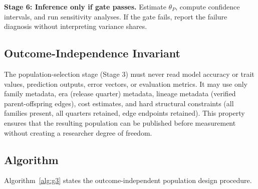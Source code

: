 \documentclass[11pt]{article}
\theoremstyle{definition}
\theoremstyle{plain}
\begin{document}
\textbf{Stage 6: Inference only if gate passes.} Estimate $\theta_P$, compute confidence intervals, and run sensitivity analyses. If the gate fails, report the failure diagnosis without interpreting variance shares.

\subsection{Outcome-Independence Invariant}
The population-selection stage (Stage 3) must never read model accuracy or trait values, prediction outputs, error vectors, or evaluation metrics. It may use only family metadata, era (release quarter) metadata, lineage metadata (verified parent-offspring edges), cost estimates, and hard structural constraints (all families present, all quarters retained, edge endpoints retained). This property ensures that the resulting population can be published before measurement without creating a researcher degree of freedom.

\subsection{Algorithm}
Algorithm~\ref{alg:g3} states the outcome-independent population design procedure.
\end{document}
